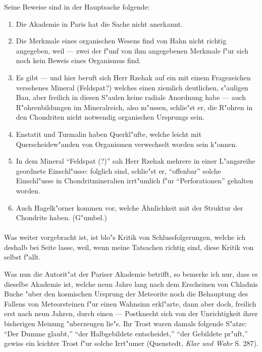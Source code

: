 \documentclass[a4paper, 12pt, oneside]{article}
\begin{document}
Seine Beweise sind in der Hauptsache folgende:
\begin{enumerate}
    \item Die Akademie in Paris hat die Sache nicht anerkannt.
    \item Die Merkmale eines organischen Wesens find von Hahn nicht richtig angegeben, weil --- zwei der f"unf von ihm angegebenen Merkmale f"ur sich noch kein Beweis eines Organismus find.
    \item Es gibt --- und hier beruft sich Herr Rzehak auf ein mit einem Fragezeichen versehenes Mineral (Feldspat?) welches einen ziemlich deutlichen, s"auligen Bau, aber freilich in diesen S"aulen keine radiale Anordnung habe --- auch R"ohrenbildungen im Mineralreich, also m"ussen, schlie"st er, die R"ohren in den Chondriten nicht notwendig organischen Ursprungs sein.
    \item Enstatit und Turmalin haben Querkl"ufte, welche leicht mit Querscheidew"anden von Organismen verwechselt worden sein k"onnen.
    \item In dem Mineral "`Feldspat (?)"' sah Herr Rzehak mehrere in einer L"angsreihe geordnete Einschl"usse: folglich sind, schlie"st er, "`offenbar"' solche Einschl"usse in Chondritmineralien irrt"umlich f"ur "`Perforationen"' gehalten worden.
    \item Auch Hagelk"orner kommen vor, welche Ähnlichkeit mit der Struktur der Chondrite haben. (G"umbel.)
\end{enumerate}
\paragraph{}
Was weiter vorgebracht ist, ist blo"s Kritik von Schlussfolgerungen, welche ich deshalb bei Seite lasse, weil, wenn meine Tatsachen richtig sind, diese Kritik von selbst f"allt.

Was nun die Autorit"at der Pariser Akademie betrifft, so bemerke ich nur, dass es dieselbe Akademie ist, welche neun Jahre lang nach dem Erscheinen von Chladnis Buche "uber den kosmischen Ursprung der Meteorite noch die Behauptung des Fallens von Meteorsteinen f"ur einen Wahnsinn erkl"arte, dann aber doch, freilich erst nach neun Jahren, durch einen --- Postknecht sich von der Unrichtigkeit ihrer bisherigen Meinung "uberzeugen lie"s. Ihr Trost waren damals folgende S"atze: "`Der Dumme glaubt,"' "`der Halbgebildete entscheidet,"' "`der Gebildete pr"uft,"' gewiss ein leichter Trost f"ur solche Irrt"umer (Quenstedt, \emph{Klar und Wahr} S. 287).
\end{document}
